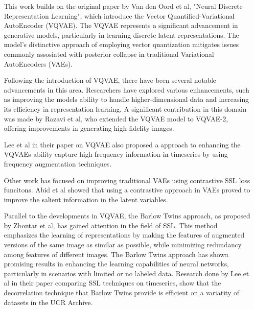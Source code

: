 
This work builds on the original paper by Van den Oord et al\cite{neuvqvae}, "Neural Discrete Representation Learning", which introduce the Vector Quantified-Variational AutoEncoder (VQVAE).
The VQVAE represents a significant advancement in generative models, particularly in learning discrete latent representations. The model's distinctive approach of employing vector quantization mitigates issues commonly assosiated with posterior collapse in traditional
Variational AutoEncoders (VAEs).

Following the introduction of VQVAE, there have been several notable advancements in this area. Researchers have explored various enhancements, such as improving the models ability to handle higher-dimensional data and increasing its efficiency in representation learning.
A significant contribution in this domain was made by Razavi et al\cite{VQVAE-2}, who extended the VQVAE model to VQVAE-2, offering improvements in generating high fidelity images.

Lee et al in their paper on VQVAE\cite{lee2023masked} also proposed a approach to enhancing the VQVAEs ability capture high frequency information in timeseries by using frequency augmentation techniques.

Other work has focused on improving traditional VAEs using contrastive SSL loss funcitons. Abid et al\cite{cvae} showed that using a contrastive approach in VAEs proved to improve the salient information in the latent variables. 

Parallel to the developments in VQVAE, the Barlow Twins approach, as proposed by Zbontar et al\cite{Barlow}, has gained attention in the field of SSL. This method emphasizes the learning of representations by making the features of augmented versions of the same image as similar as possible, while minimizing redundancy among features of different images. 
The Barlow Twins approach has shown promising results in enhancing the learning capabilities of neural networks, particularly in scenarios with limited or no labeled data. 
Research done by Lee et al in their paper comparing SSL techniques on timeseries\cite{SSLs}, show that the decorrelation technique that Barlow Twins provide is efficient on a variatity of datasets in the UCR Archive\cite{UCRArchive2018}.

